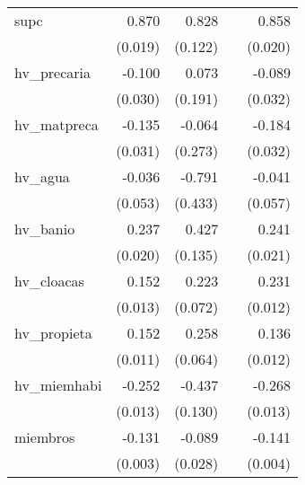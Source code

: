 {\begin{longtable}{l*{4}{D{.}{.}{-1}}}
\addlinespace
supc        &       0.870\sym{***}&       0.828\sym{***}&                     &       0.858\sym{***}\\
            &     (0.019)         &     (0.122)         &                     &     (0.020)         \\
\addlinespace
hv\_precaria &      -0.100\sym{***}&       0.073         &                     &      -0.089\sym{**} \\
            &     (0.030)         &     (0.191)         &                     &     (0.032)         \\
\addlinespace
hv\_matpreca &      -0.135\sym{***}&      -0.064         &                     &      -0.184\sym{***}\\
            &     (0.031)         &     (0.273)         &                     &     (0.032)         \\
\addlinespace
hv\_agua     &      -0.036         &      -0.791         &                     &      -0.041         \\
            &     (0.053)         &     (0.433)         &                     &     (0.057)         \\
\addlinespace
hv\_banio    &       0.237\sym{***}&       0.427\sym{**} &                     &       0.241\sym{***}\\
            &     (0.020)         &     (0.135)         &                     &     (0.021)         \\
\addlinespace
hv\_cloacas  &       0.152\sym{***}&       0.223\sym{**} &                     &       0.231\sym{***}\\
            &     (0.013)         &     (0.072)         &                     &     (0.012)         \\
\addlinespace
hv\_propieta &       0.152\sym{***}&       0.258\sym{***}&                     &       0.136\sym{***}\\
            &     (0.011)         &     (0.064)         &                     &     (0.012)         \\
\addlinespace
hv\_miemhabi &      -0.252\sym{***}&      -0.437\sym{***}&                     &      -0.268\sym{***}\\
            &     (0.013)         &     (0.130)         &                     &     (0.013)         \\
\addlinespace
miembros    &      -0.131\sym{***}&      -0.089\sym{**} &                     &      -0.141\sym{***}\\
            &     (0.003)         &     (0.028)         &                     &     (0.004)         \\

\end{longtable}}
